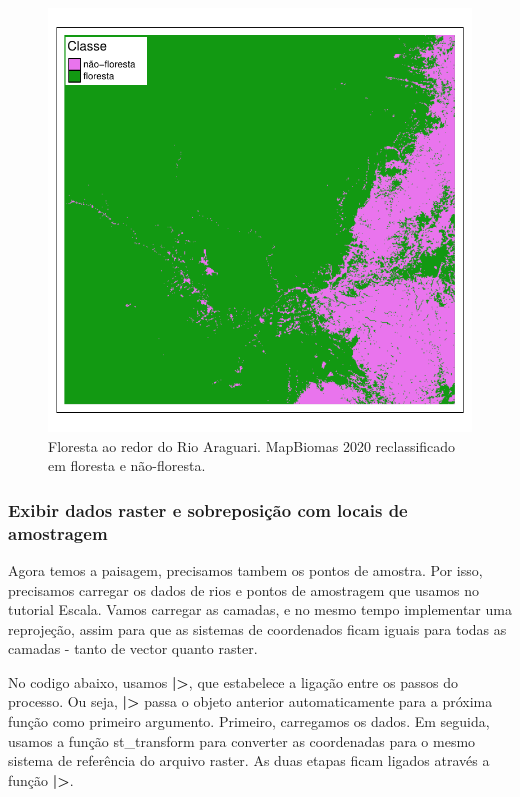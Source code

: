\documentclass[
]{article}
\begin{document}
\begin{figure}
\centering
\includegraphics{epr_files/figure-latex/unnamed-chunk-27-1.pdf}
\caption{\label{fig:unnamed-chunk-27}Floresta ao redor do Rio Araguari. MapBiomas 2020 reclassificado em floresta e não-floresta.}
\end{figure}

\hypertarget{exibir-dados-raster-e-sobreposiuxe7uxe3o-com-locais-de-amostragem}{%
\subsubsection{Exibir dados raster e sobreposição com locais de amostragem}\label{exibir-dados-raster-e-sobreposiuxe7uxe3o-com-locais-de-amostragem}}

Agora temos a paisagem, precisamos tambem os pontos de amostra. Por isso, precisamos carregar os dados de rios e pontos de amostragem que usamos no tutorial Escala. Vamos carregar as camadas, e no mesmo tempo implementar uma reprojeção, assim para que as sistemas de coordenados ficam iguais para todas as camadas - tanto de vector quanto raster.

No codigo abaixo, usamos \textbf{|>}, que estabelece a ligação entre os passos do processo. Ou seja, \textbf{|>} passa o objeto anterior automaticamente para a próxima função como primeiro argumento.
Primeiro, carregamos os dados. Em seguida, usamos a função \colorbox[HTML]{dedede}{st\_transform} para converter as coordenadas para o mesmo sistema de referência do arquivo raster. As duas etapas ficam ligados através a função \textbf{|>}.
\end{document}
